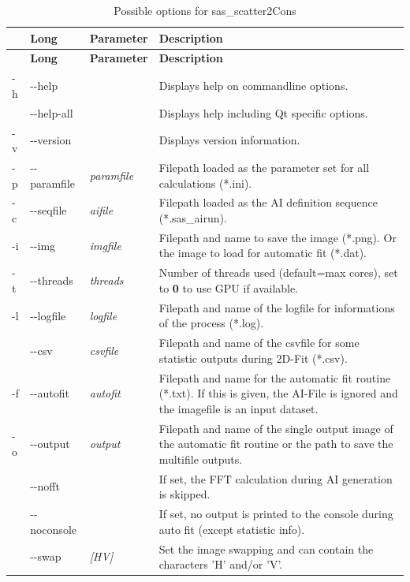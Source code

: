 \documentclass[11pt]{article} %
\begin{document}
\begin{longtable}{|L{1cm}|L{2cm}|C{2cm}|L{12cm}|}
\caption{Possible options for sas\_scatter2Cons} \\
\hline{} & {\bf Long} & {\bf Parameter} & {\bf Description} \\
\endfirsthead
\hline{} & {\bf Long} & {\bf Parameter} & {\bf Description} \\
\endhead
\hline
-h & -{}-help & & Displays help on commandline options. \\ \hline
 & -{}-help-all & & Displays help including Qt specific options. \\ \hline
-v & -{}-version & & Displays version information. \\ \hline
-p & -{}-paramfile & {\it paramfile} & Filepath loaded as the parameter set for all calculations (*.ini). \\ \hline
-c & -{}-seqfile & {\it aifile} & Filepath loaded as the AI definition sequence (*.sas\_airun). \\ \hline
-i & -{}-img & {\it imgfile} & Filepath and name to save the image (*.png). Or the image to load for automatic fit (*.dat). \\ \hline
-t & -{}-threads & {\it threads} & Number of threads used (default=max cores), set to {\bf 0} to use GPU if available. \\ \hline
-l & -{}-logfile & {\it logfile} & Filepath and name of the logfile for informations of the process (*.log). \\ \hline
 & -{}-csv & {\it csvfile} & Filepath and name of the csvfile for some statistic outputs during 2D-Fit (*.csv). \\ \hline
-f & -{}-autofit & {\it autofit} & Filepath and name for the automatic fit routine (*.txt). If this is given, the AI-File is ignored and the imagefile is an input dataset. \\ \hline
-o & -{}-output & {\it output} & Filepath and name of the single output image of the automatic fit routine or the path to save the  multifile outputs. \\ \hline
 & -{}-nofft & & If set, the FFT calculation during AI generation is skipped. \\ \hline
 & -{}-noconsole & & If set, no output is printed to the console during auto fit (except statistic info). \\ \hline
 & -{}-swap & {\it [HV]} & Set the image swapping and can contain the characters 'H' and/or 'V'. \\ \hline

\end{longtable}
\end{document}
